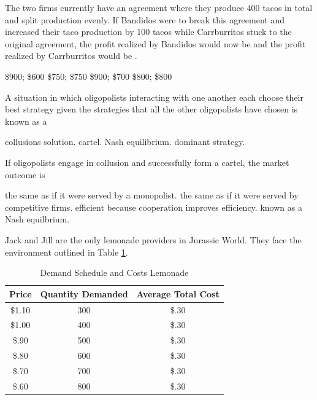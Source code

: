 \documentclass[addpoints,11pt]{exam}
\theoremstyle{definition}
\newcommand{\blank}[0]{\underline{\hspace{3cm}}}
\begin{document}
\begin{questions}
	The two firms currently have an agreement where they produce 400 tacos in total and split production evenly. If Bandidos were to break this agreement and increased their taco production by 100 tacos while Carrburritos stuck to the original agreement, the profit realized by Bandidos would now be \underline{\hspace{3cm}} and the profit realized by Carrburritos would be \blank.
	
	
	\begin{choices}
		\CorrectChoice \$900; \$600
		\choice \$750; \$750
		\choice \$900; \$700
		\choice \$800; \$800
	\end{choices} 


\question A situation in which oligopolists interacting with one another each choose their best strategy given the strategies that all the other oligopolists have chosen is known as a 

\begin{choices}
	\choice collusions solution.
	\choice cartel.
	\CorrectChoice Nash equilibrium.
	\choice dominant strategy.
\end{choices}	

\question If oligopolists engage in collusion and successfully form a cartel, the market outcome is 

\begin{choices}
	\CorrectChoice the same as if it were served by a monopolist.
	\choice the same as if it were served by competitive firms.
	\choice efficient because cooperation improves efficiency.
	\choice known as a Nash equilbrium.
\end{choices}
	
	\question Jack and Jill are the only lemonade providers in Jurassic World. They face the environment outlined in Table \ref{MC21}. 
	
	

	\begin{table}[H]
		\caption{Demand Schedule and Costs Lemonade}
		\centering
		\begin{tabular}{c|c|c}
			Price & Quantity Demanded & Average Total Cost \\
			\hline
			\$1.10 & 300 & \$.30\\
			\$1.00 & 400 & \$.30\\
			\$.90 & 500 & \$.30\\
			\$.80 & 600 & \$.30 \\
			\$.70 & 700 & \$.30 \\
			\$.60 & 800 & \$.30 \\
		\end{tabular} 
		\label{MC21}
	\end{table}
	

\end{questions}
\end{document}
